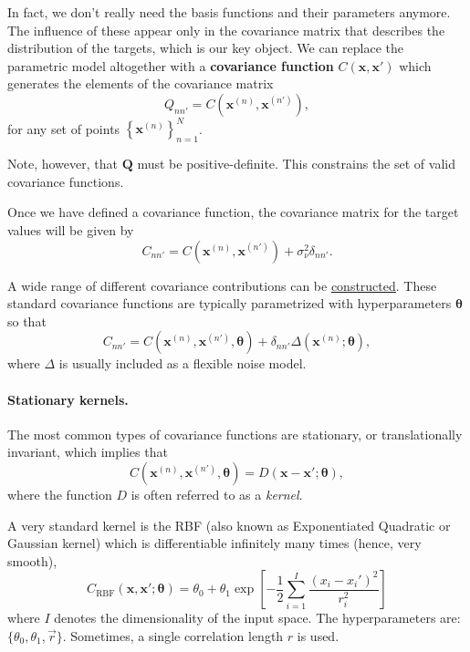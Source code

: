 \documentclass[%
oneside,                 %
final,                   %
10pt]{article}
\begin{document}
In fact, we don't really need the basis functions and their parameters anymore. The influence of these appear only in the covariance matrix that describes the distribution of the targets, which is our key object. We can replace the parametric model altogether with a \textbf{covariance function} $C( \boldsymbol{x}, \boldsymbol{x}' )$ which generates the  elements of the covariance matrix
\[
Q_{nn'} = C \left( \boldsymbol{x}^{(n)}, \boldsymbol{x}^{(n')} \right),
\]
for any set of points $\left\{ \boldsymbol{x}^{(n)} \right\}_{n=1}^N$.

Note, however, that $\boldsymbol{Q}$ must be positive-definite. This constrains the set of valid covariance functions.

Once we have defined a covariance function, the covariance matrix for the target values will be given by
\[
C_{nn'} = C \left( \boldsymbol{x}^{(n)}, \boldsymbol{x}^{(n')} \right) + \sigma_\nu^2 \delta_{nn'}.
\]

A wide range of different covariance contributions can be \href{{https://en.wikipedia.org/wiki/Gaussian_process#Covariance_functions}}{constructed}. These standard covariance functions are typically parametrized with hyperparameters $\boldsymbol{\theta}$ so that 
\[
C_{nn'} = C \left( \boldsymbol{x}^{(n)}, \boldsymbol{x}^{(n')}, \boldsymbol{\theta} \right) + \delta_{nn'} \Delta \left( \boldsymbol{x}^{(n)};  \boldsymbol{\theta} \right),
\]
where $\Delta$ is usually included as a flexible noise model.

\paragraph{Stationary kernels.}
The most common types of covariance functions are stationary, or translationally invariant, which implies that 
\[
C \left( \boldsymbol{x}^{(n)}, \boldsymbol{x}^{(n')}, \boldsymbol{\theta} \right) = D \left( \boldsymbol{x} - \boldsymbol{x}'; \boldsymbol{\theta} \right),
\]
where the function $D$ is often referred to as a \emph{kernel}.

A very standard kernel is the RBF (also known as Exponentiated Quadratic or Gaussian kernel) which is differentiable infinitely many times (hence, very smooth),
\[ 
C_\mathrm{RBF}(\mathbf{x},\mathbf{x}'; \boldsymbol{\theta}) = \theta_0 + \theta_1 \exp \left[ -\frac{1}{2} \sum_{i=1}^I \frac{(x_{i} - x_{i}')^2}{r_i^2} \right] 
\]
where $I$ denotes the dimensionality of the input space. The hyperparameters are: $\{ \theta_0, \theta_1, \vec{r} \}$. Sometimes, a single correlation length $r$ is used.
\end{document}
